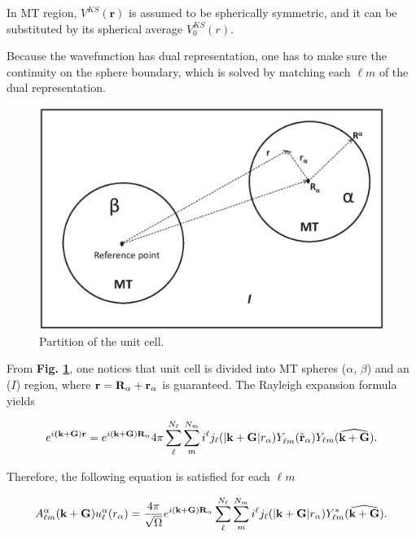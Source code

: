 \documentclass[a4paper, 12pt, titlepage,oneside,drop]{kthesis}
\begin{document}
In MT region, $V^{KS}(\textbf{r})$ is assumed to be spherically symmetric, and it can be substituted by its spherical average $V^{KS}_0({r})$.

Because the wavefunction has dual representation, one has to make sure the continuity on the sphere boundary, which is solved by matching each $\ell m$
of the dual representation.

\begin{figure}[h]
\begin{center}
\includegraphics[scale=0.5]{unitcell.eps}
\caption{Partition of the unit cell.}
\label{ucuc}
\end{center}
\end{figure}

From \textbf{Fig. \ref{ucuc}}, one notices that unit cell is divided into MT spheres ($\alpha$, $\beta$) and an
($I$) region, where ${\textbf r = {\textbf R_{\alpha}}+{\textbf r_{\alpha}}}$ is guaranteed. The Rayleigh expansion formula yields

\begin{equation}
\expg<(\textbf {k}+\textbf{G})> = e^{i (\textbf {k}+\textbf{G}) \textbf{R}_{\alpha} } 4 \pi \sum\limits_{{\ell}}^{N_{\ell}} \sum\limits_{{m}}^{N_{m}} i^{\ell} \bessf< |\textbf{k}+\textbf{G}|> \sphfr<\ell{m}><r><> Y_{\ell{m}}(\widehat{\textbf{k}+\textbf{G}}).
\end{equation}
  
Therefore, the following equation is satisfied for each ${\ell}m$

\begin{equation}
A _{{\ell}m}^{\alpha} (\textbf {k}+\textbf{G})  u_{{\ell}}^{\alpha}(r_{\alpha})=  \frac{4 \pi }{\sqrt{\Omega}} e^{i (\textbf {k}+\textbf{G}) \textbf{R}_{\alpha} }  \sum\limits_{{\ell}}^{N_{\ell}} \sum\limits_{{m}}^{N_{m}} i^{\ell} \bessf< |\textbf{k}+\textbf{G}|> Y^{*}_{\ell{m}}(\widehat{\textbf{k}+\textbf{G}}).
\end{equation}
\end{document}
